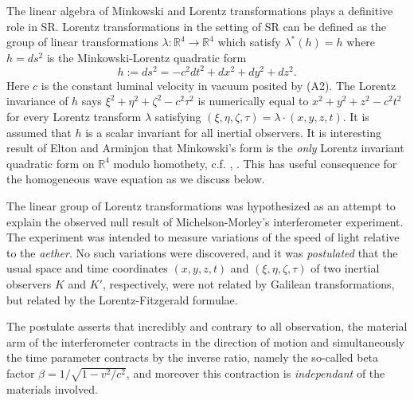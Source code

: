\documentclass[12pt]{article}
\newcommand{\bR}{\mathbb{R}}
\begin{document}
The linear algebra of Minkowski and Lorentz transformations plays a definitive role in SR. Lorentz transformations in the setting of SR can be defined as the group of linear transformations $\lambda: \bR^{4} \to \bR^4$ which satisfy $\lambda^*(h)=h$ where $h=ds^2$ is the Minkowski-Lorentz quadratic form \begin{equation}\label{mform}
h:=ds^2=-c^2dt^2+dx^2+dy^2+dz^2.\end{equation} 
Here $c$ is the constant luminal velocity in vacuum posited by (A2). The Lorentz invariance of $h$ says $\xi^2+\eta^2+\zeta^2-c^2 \tau^2$ is numerically equal to $x^2+y^2+z^2-c^2 t^2$ for every Lorentz transform $\lambda$ satisfying $(\xi, \eta, \zeta, \tau)=\lambda \cdot (x,y,z,t)$. It is assumed that $h$ is a scalar invariant for all inertial observers. It is interesting result of Elton and Arminjon that Minkowski's form is the \emph{only} Lorentz invariant quadratic form on $\bR^4$ modulo homothety, c.f. \cite{elton2010indefinite}, \cite{arminjon2018lorentz}. This has useful consequence for the homogeneous wave equation as we discuss below.

The linear group of Lorentz transformations was hypothesized as an attempt to explain the observed null result of Michelson-Morley's interferometer experiment. The experiment was intended to measure variations of the speed of light relative to the \emph{aether}. No such variations were discovered, and it was \emph{postulated} that the usual space and time coordinates $(x,y,z,t)$ and $(\xi, \eta, \zeta, \tau)$ of two inertial observers $K$ and $K'$, respectively, were not related by Galilean transformations, but related by the Lorentz-Fitzgerald formulae. 

The postulate asserts that incredibly and contrary to all observation, the material arm of the interferometer contracts in the direction of motion and simultaneously the time parameter contracts by the inverse ratio, namely the so-called beta factor $\beta = 1/\sqrt{1-v^2/c^2}$, and moreover this contraction is \emph{independant} of the materials involved. %



\end{document}
